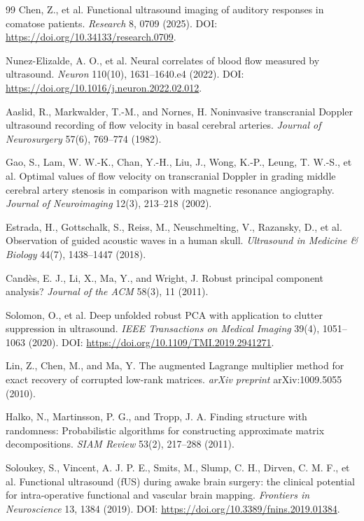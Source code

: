 \documentclass[11pt]{article}
\begin{document}
\begin{thebibliography}{99}
Chen, Z., et al.
\newblock Functional ultrasound imaging of auditory responses in comatose patients.
\newblock \emph{Research} 8, 0709 (2025).
\newblock DOI: \url{https://doi.org/10.34133/research.0709}.

Nunez-Elizalde, A. O., et al.
\newblock Neural correlates of blood flow measured by ultrasound.
\newblock \emph{Neuron} 110(10), 1631--1640.e4 (2022).
\newblock DOI: \url{https://doi.org/10.1016/j.neuron.2022.02.012}.

Aaslid, R., Markwalder, T.-M., and Nornes, H.
\newblock Noninvasive transcranial Doppler ultrasound recording of flow velocity in basal cerebral arteries.
\newblock \emph{Journal of Neurosurgery} 57(6), 769--774 (1982).

Gao, S., Lam, W. W.-K., Chan, Y.-H., Liu, J., Wong, K.-P., Leung, T. W.-S., et al.
\newblock Optimal values of flow velocity on transcranial Doppler in grading middle cerebral artery stenosis in comparison with magnetic resonance angiography.
\newblock \emph{Journal of Neuroimaging} 12(3), 213--218 (2002).

Estrada, H., Gottschalk, S., Reiss, M., Neuschmelting, V., Razansky, D., et al.
\newblock Observation of guided acoustic waves in a human skull.
\newblock \emph{Ultrasound in Medicine \& Biology} 44(7), 1438--1447 (2018).

Cand{\`e}s, E. J., Li, X., Ma, Y., and Wright, J.
\newblock Robust principal component analysis?
\newblock \emph{Journal of the ACM} 58(3), 11 (2011).

Solomon, O., et al.
\newblock Deep unfolded robust PCA with application to clutter suppression in ultrasound.
\newblock \emph{IEEE Transactions on Medical Imaging} 39(4), 1051--1063 (2020).
\newblock DOI: \url{https://doi.org/10.1109/TMI.2019.2941271}.

Lin, Z., Chen, M., and Ma, Y.
\newblock The augmented Lagrange multiplier method for exact recovery of corrupted low-rank matrices.
\newblock \emph{arXiv preprint} arXiv:1009.5055 (2010).

Halko, N., Martinsson, P. G., and Tropp, J. A.
\newblock Finding structure with randomness: Probabilistic algorithms for constructing approximate matrix decompositions.
\newblock \emph{SIAM Review} 53(2), 217--288 (2011).

Soloukey, S., Vincent, A. J. P. E., Smits, M., Slump, C. H., Dirven, C. M. F., et al.
\newblock Functional ultrasound (fUS) during awake brain surgery: the clinical potential for intra-operative functional and vascular brain mapping.
\newblock \emph{Frontiers in Neuroscience} 13, 1384 (2019).
\newblock DOI: \url{https://doi.org/10.3389/fnins.2019.01384}.


\end{thebibliography}
\end{document}
